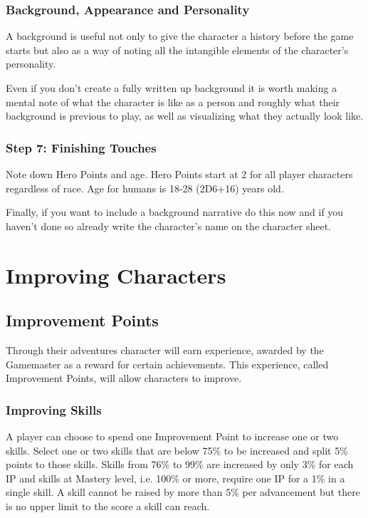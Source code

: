 \subsubsection{Background, Appearance and Personality}
A background is useful not only to give the character a history before the game starts but also as a way of noting all the intangible elements of the character’s personality. 

Even if you don’t create a fully written up background it is worth making a mental note of what the character is like as a person and roughly what their background is previous to play, as well as visualizing what they actually look like. 

\subsubsection{Step 7: Finishing Touches}
Note down Hero Points and age. Hero Points start at 2 for all player characters regardless of race. Age for humans is 18-28 (2D6+16) years old.

Finally, if you want to include a background narrative do this now and if you haven’t done so already write the character’s name on the character sheet.


\section{Improving Characters}

\subsection{Improvement Points}
\label{ssec:improvement-points}
Through their adventures character will earn experience, awarded by the Gamemaster as a reward for certain achievements. This experience, called Improvement Points, will allow characters to improve.

\subsubsection{Improving Skills}
A player can choose to spend one Improvement Point to increase one or two skills.
Select one or two skills that are below 75\% to be increased and split 5\% points to those skills. Skills from 76\% to 99\% are increased by only 3\% for each IP and skills at Mastery level, i.e. 100\% or more, require one IP for a 1\% in a single skill.
A skill cannot be raised by more than 5\% per advancement but there is no upper limit to the score a skill can reach. 

